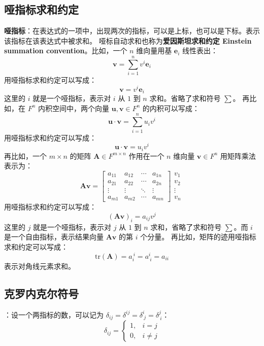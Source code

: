 \subsection{哑指标求和约定}
\textbf{哑指标}：在表达式的一项中，出现两次的指标，可以是上标，也可以是下标。表示该指标在该表达式中被求和。
哑标自动求和也称为\textbf{爱因斯坦求和约定 Einstein summation convention}。比如，一个 $n$ 维向量用基 $\mathbf{e}_i$ 线性表出：
\[
    \mathbf{v} = \sum^n_{i=1}v^i \mathbf{e}_i
\]
用哑指标求和约定可以写成：
\[
    \mathbf{v} = v^i \mathbf{e}_i
\]
这里的 $i$ 就是一个哑指标，表示对 $i$ 从 $1$ 到 $n$ 求和。省略了求和符号 $\sum$。
再比如，在 $F^n$ 内积空间中，两个向量 $\mathbf{u}, \mathbf{v} \in F^n$ 的内积可以写成：
\[
    \mathbf{u} \cdot \mathbf{v} = \sum^n_{i=1} u_i v^i
\]
用哑指标求和约定可以写成：
\[
    \mathbf{u} \cdot \mathbf{v} = u_i v^i
\]
再比如，一个 $m \times n$ 的矩阵 $\mathbf{A} \in F^{m \times n}$ 作用在一个 $n$ 维向量 $\mathbf{v} \in F^n$ 用矩阵乘法表示为：
\[
    \mathbf{A} \mathbf{v} = \begin{bmatrix}
        a_{11} & a_{12} & \cdots & a_{1n} \\
        a_{21} & a_{22} & \cdots & a_{2n} \\
        \vdots & \vdots & \ddots & \vdots \\
        a_{m1} & a_{m2} & \cdots & a_{mn}
    \end{bmatrix}\begin{matrix}
        v_1 \\ v_2 \\ \vdots \\ v_n
    \end{matrix}
\]
用哑指标求和约定可以写成：
\[
    (\mathbf{A} \mathbf{v})_i = a_{ij} v^j
\]
这里的 $j$ 就是一个哑指标，表示对 $j$ 从 $1$ 到 $n$ 求和，省略了求和符号 $\sum$。而 $i$ 是一个自由指标，表示结果向量 $\mathbf{A} \mathbf{v}$ 的第 $i$ 个分量。
再比如，矩阵的迹用哑指标求和约定可以写成：
\[
    \mathrm{tr}(\mathbf{A}) = a_i^{\ i} = a^i_{\ i} = a_{ii}
\]
表示对角线元素求和。

\vspace{1em}

\subsection{克罗内克尔符号}

\begin{definition}：设一个两指标的数，可以记为 $\delta_{ij} = \delta^{ij} = \delta^{i}_{\ j}= \delta^{j}_{\ i}$：
\[
    \delta_{ij} = \begin{cases}
        1, & i = j \\
        0, & i \neq j
    \end{cases}
\]
\label{def:kronecker_delta}
\end{definition}


